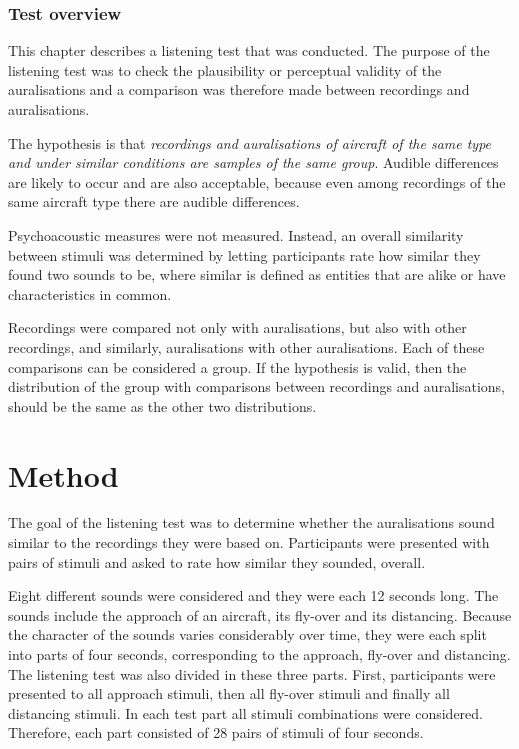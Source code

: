 \subsubsection*{Test overview}
This chapter describes a listening test that was conducted. The purpose of the
listening test was to check the plausibility or perceptual validity of the
auralisations and a comparison was therefore made between recordings and
auralisations.

The hypothesis is that \emph{recordings and auralisations of aircraft of the same
type and under similar conditions are samples of the same group}.
Audible differences are likely to occur and are also acceptable, because even
among recordings of the same aircraft type there are audible differences.

Psychoacoustic measures were not measured. Instead, an overall similarity
between stimuli was determined by letting participants rate how similar they
found two sounds to be, where similar is defined as entities that are alike or
have characteristics in common.

Recordings were compared not only with auralisations,
but also with other recordings, and similarly, auralisations with other
auralisations. Each of these comparisons can be considered a group. If the
hypothesis is valid, then the distribution of the group with comparisons between
recordings and auralisations, should be the same as the other two distributions.

\section{Method}

The goal of the listening test was to determine whether the auralisations sound
similar to the recordings they were based on. Participants were presented with
pairs of stimuli and asked to rate how similar they sounded, overall.

Eight different sounds were considered and they were each 12 seconds long. The
sounds include the approach of an aircraft, its fly-over and its distancing.
Because the character of the sounds varies considerably over time, they were
each split into parts of four seconds, corresponding to the approach, fly-over
and distancing. The listening test was also divided in these three parts. First,
participants were presented to all approach stimuli, then all fly-over stimuli
and finally all distancing stimuli. In each test part all stimuli combinations
were considered. Therefore, each part consisted of 28 pairs of stimuli of four
seconds.

